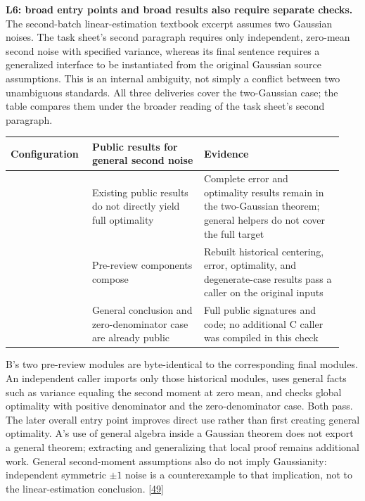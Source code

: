 \textbf{L6: broad entry points and broad results also require separate checks.} The second-batch linear-estimation textbook excerpt assumes two Gaussian noises. The task sheet's second paragraph requires only independent, zero-mean second noise with specified variance, whereas its final sentence requires a generalized interface to be instantiated from the original Gaussian source assumptions. This is an internal ambiguity, not simply a conflict between two unambiguous standards. All three deliveries cover the two-Gaussian case; the table compares them under the broader reading of the task sheet's second paragraph.

\begingroup\small\setlength{\tabcolsep}{3pt}\renewcommand{\arraystretch}{1.14}
\par\nopagebreak\medskip\noindent\begin{minipage}[t]{\linewidth}
\begin{tabular}{>{\raggedright\arraybackslash}p{0.22\linewidth}>{\raggedright\arraybackslash}p{0.32\linewidth}>{\raggedright\arraybackslash}p{0.4\linewidth}}
\toprule
\textbf{Configuration} & \textbf{Public results for general second noise} & \textbf{Evidence}\\\midrule

{A} & {Existing public results do not directly yield full optimality} & {Complete error and optimality results remain in the two-Gaussian theorem; general helpers do not cover the full target}\\
{B} & {Pre-review components compose} & {Rebuilt historical centering, error, optimality, and degenerate-case results pass a caller on the original inputs}\\
{C} & {General conclusion and zero-denominator case are already public} & {Full public signatures and code; no additional C caller was compiled in this check}\\
\bottomrule\end{tabular}\end{minipage}\par\medskip\endgroup
B's two pre-review modules are byte-identical to the corresponding final modules. An independent caller imports only those historical modules, uses general facts such as variance equaling the second moment at zero mean, and checks global optimality with positive denominator and the zero-denominator case. Both pass. The later overall entry point improves direct use rather than first creating general optimality. A's use of general algebra inside a Gaussian theorem does not export a general theorem; extracting and generalizing that local proof remains additional work. General second-moment assumptions also do not imply Gaussianity: independent symmetric $\pm1$ noise is a counterexample to that implication, not to the linear-estimation conclusion. \hyperlink{ref-49}{\mbox{[49]}}

